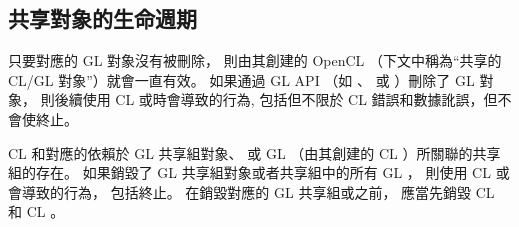 \subsection{共享對象的生命週期}

只要對應的 GL 對象沒有被刪除，
則由其創建的 OpenCL （下文中稱為“共享的 CL/GL 對象”）就會一直有效。
如果通過 GL API （如 、  或 ）刪除了 GL 對象，
則後續使用 CL 或時會導致的行為,
包括但不限於 CL 錯誤和數據訛誤，但不會使終止。

CL 和對應的依賴於 GL 共享組對象、
或 GL （由其創建的 CL ）所關聯的共享組的存在。
如果銷毀了 GL 共享組對象或者共享組中的所有 GL ，
則使用 CL 或會導致的行為，
包括終止。
在銷毀對應的 GL 共享組或之前，
應當先銷毀 CL 和 CL 。


